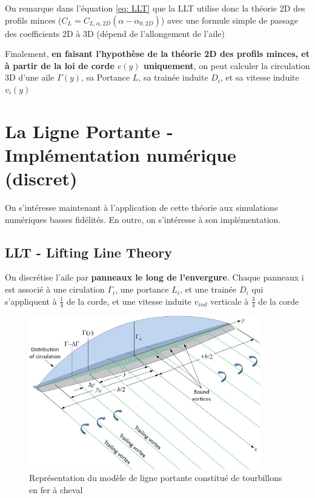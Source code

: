 On remarque dans l'équation \ref{eq: LLT} que la LLT utilise donc la théorie 2D des profils minces ($C_L = C_{L, \alpha, 2D}(\alpha - \alpha_{0,2D})$) avec une formule simple de passage des coefficients 2D à 3D (dépend de l'allongement de l'aile)

Finalement, \textbf{en faisant l'hypothèse de la théorie 2D des profils minces, et à partir de la loi de corde $c(y)$ uniquement}, on peut calculer la circulation 3D d'une aile $\Gamma(y)$, sa Portance $L$, sa trainée induite $D_i$, et sa vitesse induite $v_i(y)$

\section{La Ligne Portante - Implémentation numérique (discret)} 
\label{sec:Ch1.2}

On s'intéresse maintenant à l'application de cette théorie aux simulations numériques basses fidélités. En outre, on s'intéresse à son implémentation. 

\subsection{LLT - Lifting Line Theory} 
\label{subsec:Ch1.2.1}

On discrétise l'aile par \textbf{panneaux le long de l'envergure}. Chaque panneaux i est associé à une cirulation $\Gamma_i$, une portance $L_i$, et une trainée $D_i$ qui s'appliquent à $\frac{1}{4}$ de la corde, et une vitesse induite $v_{ind}$ verticale à $\frac{3}{4}$ de la corde

\begin{figure}[H]
    \centering
    \includegraphics[width=0.9\textwidth]{Pics/01 - Basses Fidélités/LLT schéma.jpg}
    \caption{Représentation du modèle de ligne portante constitué de tourbillons en fer à cheval}
    \label{fig: vortex vsm}
\end{figure}

